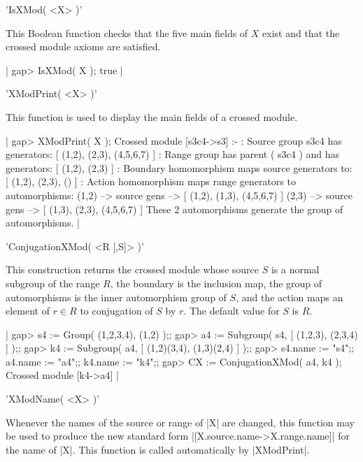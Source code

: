 %

'IsXMod( <X> )'

This Boolean function checks that the five main fields of  $X$  exist
and that the crossed module axioms are satisfied.

|    gap> IsXMod( X );
    true |

%

'XModPrint( <X> )'

This function is used to display the main fields of a crossed module.

|    gap> XModPrint( X );
    Crossed module [s3c4->s3] :- 
    : Source group s3c4 has generators:
      [ (1,2), (2,3), (4,5,6,7) ]
    : Range group has parent ( s3c4 ) and has generators:
      [ (1,2), (2,3) ]
    : Boundary homomorphism maps source generators to:
      [ (1,2), (2,3), () ]
    : Action homomorphism maps range generators to automorphisms:
      (1,2) --> { source gens --> [ (1,2), (1,3), (4,5,6,7) ] }
      (2,3) --> { source gens --> [ (1,3), (2,3), (4,5,6,7) ] }
      These 2 automorphisms generate the group of automorphisms.   |

%

'ConjugationXMod( <R [,S]> )'

This construction returns the crossed module whose source $S$ is a normal
subgroup of the range $R$, the boundary is the inclusion map,
the group of automorphisms is the inner automorphism group of $S$,
and the action maps an element of $r \in R$ to conjugation of $S$ by $r$.
The default value for  $S$  is  $R$.

|    gap> s4 := Group( (1,2,3,4), (1,2) );;
    gap> a4 := Subgroup( s4, [ (1,2,3), (2,3,4) ] );;
    gap> k4 := Subgroup( a4, [ (1,2)(3,4), (1,3)(2,4) ] );;
    gap> s4.name := "s4";;  a4.name := "a4";;  k4.name := "k4";;
    gap> CX := ConjugationXMod( a4, k4 );
    Crossed module [k4->a4] |

%

'XModName( <X> )'

Whenever the names of the source or range of |X| are changed,
this function may be used to produce the new standard form
|[X.source.name->X.range.name]|  for the name of |X|.
This function is called automatically by |XModPrint|.

